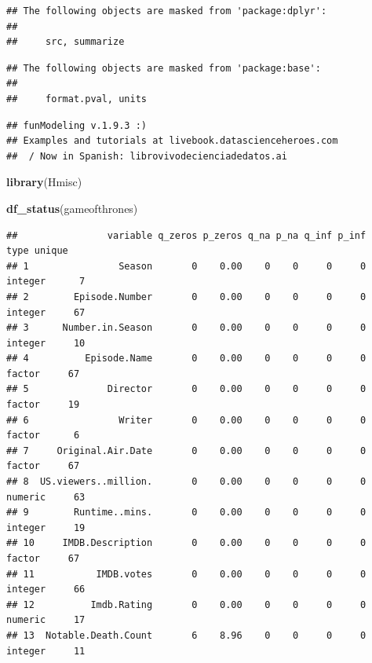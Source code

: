 \documentclass[]{article}
\newenvironment{Shaded}{\begin{snugshade}}{\end{snugshade}}
\newcommand{\KeywordTok}[1]{\textcolor[rgb]{0.13,0.29,0.53}{\textbf{#1}}}
\newcommand{\NormalTok}[1]{#1}
\begin{document}
\begin{verbatim}
## The following objects are masked from 'package:dplyr':
## 
##     src, summarize
\end{verbatim}

\begin{verbatim}
## The following objects are masked from 'package:base':
## 
##     format.pval, units
\end{verbatim}

\begin{verbatim}
## funModeling v.1.9.3 :)
## Examples and tutorials at livebook.datascienceheroes.com
##  / Now in Spanish: librovivodecienciadedatos.ai
\end{verbatim}

\begin{Shaded}
\begin{Highlighting}[]
\KeywordTok{library}\NormalTok{(Hmisc)}
\end{Highlighting}
\end{Shaded}

\begin{Shaded}
\begin{Highlighting}[]
\KeywordTok{df_status}\NormalTok{(gameofthrones)}
\end{Highlighting}
\end{Shaded}

\begin{verbatim}
##                variable q_zeros p_zeros q_na p_na q_inf p_inf    type unique
## 1                Season       0    0.00    0    0     0     0 integer      7
## 2        Episode.Number       0    0.00    0    0     0     0 integer     67
## 3      Number.in.Season       0    0.00    0    0     0     0 integer     10
## 4          Episode.Name       0    0.00    0    0     0     0  factor     67
## 5              Director       0    0.00    0    0     0     0  factor     19
## 6                Writer       0    0.00    0    0     0     0  factor      6
## 7     Original.Air.Date       0    0.00    0    0     0     0  factor     67
## 8  US.viewers..million.       0    0.00    0    0     0     0 numeric     63
## 9        Runtime..mins.       0    0.00    0    0     0     0 integer     19
## 10     IMDB.Description       0    0.00    0    0     0     0  factor     67
## 11           IMDB.votes       0    0.00    0    0     0     0 integer     66
## 12          Imdb.Rating       0    0.00    0    0     0     0 numeric     17
## 13  Notable.Death.Count       6    8.96    0    0     0     0 integer     11
\end{verbatim}
\end{document}
